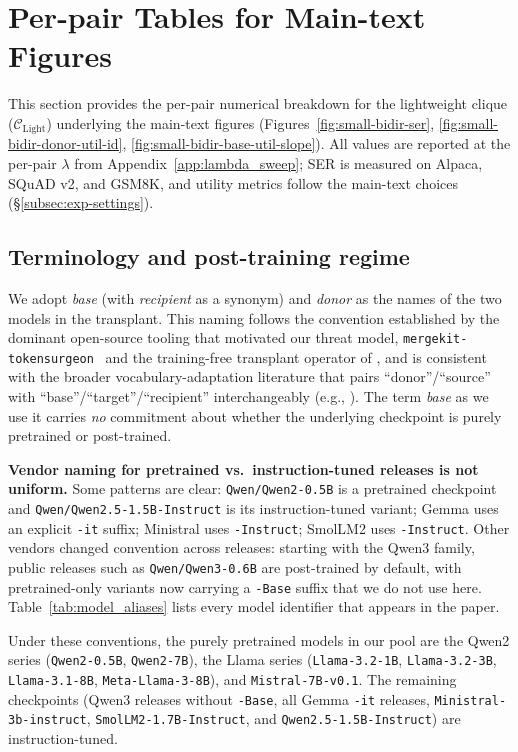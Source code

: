 \section{Per-pair Tables for Main-text Figures}
\label{app:main_tables}

This section provides the per-pair numerical breakdown for the lightweight clique ($\mathcal{C}_{\text{Light}}$) underlying the main-text figures (Figures~\ref{fig:small-bidir-ser}, \ref{fig:small-bidir-donor-util-id}, \ref{fig:small-bidir-base-util-slope}). All values are reported at the per-pair $\lambda$ from Appendix~\ref{app:lambda_sweep}; SER is measured on Alpaca, SQuAD v2, and GSM8K, and utility metrics follow the main-text choices (\S\ref{subsec:exp-settings}).

\subsection{Terminology and post-training regime}
\label{app:terminology}

We adopt \emph{base} (with \emph{recipient} as a synonym) and \emph{donor} as the names of the two models in the transplant. This naming follows the convention established by the dominant open-source tooling that motivated our threat model, \texttt{mergekit-tokensurgeon}~\citep{mergekit2024} and the training-free transplant operator of \citet{goddard2025tftransplant}, and is consistent with the broader vocabulary-adaptation literature that pairs ``donor''/``source'' with ``base''/``target''/``recipient'' interchangeably (e.g., \citep{minixhofer2021wechsel,dobler2023focus,ostendorff2023efficient}). The term \emph{base} as we use it carries \emph{no} commitment about whether the underlying checkpoint is purely pretrained or post-trained.

\noindent\textbf{Vendor naming for pretrained vs.\ instruction-tuned releases is not uniform.}
Some patterns are clear: \texttt{Qwen/Qwen2-0.5B} is a pretrained checkpoint and \texttt{Qwen/Qwen2.5-1.5B-Instruct} is its instruction-tuned variant; Gemma uses an explicit \texttt{-it} suffix; Ministral uses \texttt{-Instruct}; SmolLM2 uses \texttt{-Instruct}. Other vendors changed convention across releases: starting with the Qwen3 family, public releases such as \texttt{Qwen/Qwen3-0.6B} are post-trained by default, with pretrained-only variants now carrying a \texttt{-Base} suffix that we do not use here. Table~\ref{tab:model_aliases} lists every model identifier that appears in the paper.

Under these conventions, the purely pretrained models in our pool are the Qwen2 series (\texttt{Qwen2-0.5B}, \texttt{Qwen2-7B}), the Llama series (\texttt{Llama-3.2-1B}, \texttt{Llama-3.2-3B}, \texttt{Llama-3.1-8B}, \texttt{Meta-Llama-3-8B}), and \texttt{Mistral-7B-v0.1}. The remaining checkpoints (Qwen3 releases without \texttt{-Base}, all Gemma \texttt{-it} releases, \texttt{Ministral-3b-instruct}, \texttt{SmolLM2-1.7B-Instruct}, and \texttt{Qwen2.5-1.5B-Instruct}) are instruction-tuned.

